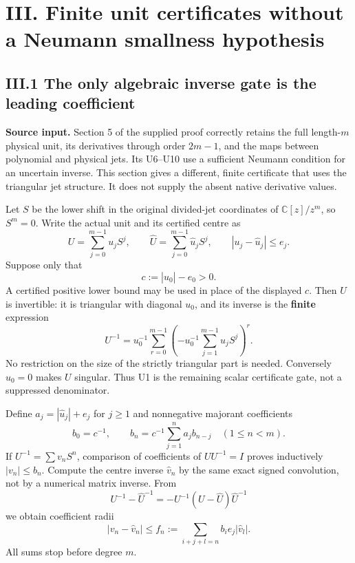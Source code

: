 \section{III. Finite unit certificates without a Neumann smallness hypothesis}\label{iii.-finite-unit-certificates-without-a-neumann-smallness-hypothesis}

\subsection{III.1 The only algebraic inverse gate is the leading coefficient}\label{iii.1-the-only-algebraic-inverse-gate-is-the-leading-coefficient}

\textbf{Source input.} Section 5 of the supplied proof correctly retains the full length-\(m\) physical unit, its derivatives through order \(2m-1\), and the maps between polynomial and physical jets. Its U6--U10 use a sufficient Neumann condition for an uncertain inverse. This section gives a different, finite certificate that uses the triangular jet structure. It does not supply the absent native derivative values.

Let \(S\) be the lower shift in the original divided-jet coordinates of \(\mathbb C[z]/z^m\), so \(S^m=0\). Write the actual unit and its certified centre as \[
 U=\sum_{j=0}^{m-1}u_jS^j,\qquad
 \widehat U=\sum_{j=0}^{m-1}\widehat u_jS^j,\qquad
 |u_j-\widehat u_j|\le e_j.
\] Suppose only that \[
 c:=|\widehat u_0|-e_0>0.
 \tag{U1}
\] A certified positive lower bound may be used in place of the displayed \(c\). Then \(U\) is invertible: it is triangular with diagonal \(u_0\), and its inverse is the \textbf{finite} expression \[
 U^{-1}=u_0^{-1}\sum_{r=0}^{m-1}
 \left(-u_0^{-1}\sum_{j=1}^{m-1}u_jS^j\right)^r.
 \tag{U2}
\] No restriction on the size of the strictly triangular part is needed. Conversely \(u_0=0\) makes \(U\) singular. Thus U1 is the remaining scalar certificate gate, not a suppressed denominator.

Define \(a_j=|\widehat u_j|+e_j\) for \(j\ge1\) and nonnegative majorant coefficients \[
 b_0=c^{-1},\qquad
 b_n=c^{-1}\sum_{j=1}^{n}a_jb_{n-j}\quad(1\le n<m).
 \tag{U3}
\] If \(U^{-1}=\sum v_nS^n\), comparison of coefficients of \(UU^{-1}=I\) proves inductively \(|v_n|\le b_n\). Compute the centre inverse \(\widehat v_n\) by the same exact signed convolution, not by a numerical matrix inverse. From \[
 U^{-1}-\widehat U^{-1}=-U^{-1}(U-\widehat U)\widehat U^{-1}
\] we obtain coefficient radii \[
 \boxed{|v_n-\widehat v_n|\le f_n:=\sum_{i+j+l=n}b_i e_j|\widehat v_l|.}
 \tag{U4}
\] All sums stop before degree \(m\).

